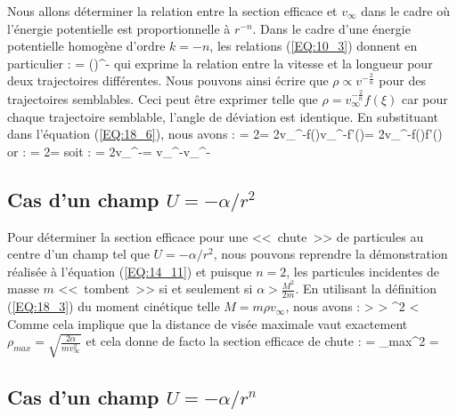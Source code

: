 Nous allons d\'eterminer la relation entre la section efficace et $v_{\infty}$ dans le cadre o\`u l'\'energie potentielle est proportionnelle \`a $r^{-n}$. Dans le cadre d'une \'energie potentielle homog\`ene d'ordre $k = -n$, les relations (\ref{EQ:10_3}) donnent en particulier :
\benn
	 = \left(\right)^{-}
\eenn
qui exprime la relation entre la vitesse et la longueur pour deux trajectoires diff\'erentes. Nous pouvons ainsi \'ecrire que $\rho\propto v^{-\frac{2}{n}}$ pour des trajectoires semblables. Ceci peut \^etre exprimer telle que $\rho = v_{\infty}^{-\frac{2}{n}}f(\xi)$ car pour chaque trajectoire semblable, l'angle de d\'eviation est identique. En substituant dans l'\'equation (\ref{EQ:18_6}), nous avons :
\benn
	\sigma = 2\pi\rho{}\rho = 2\pi v_{\infty}^{-}f(\xi)\cdot v_{\infty}^{-}f'(\xi)\xi = 2\pi v_{\infty}^{-}f(\xi)f'(\xi)\xi
\eenn
or :
\benn
	\omega = 2\pi\sin\xi{}\xi \Rightarrow {}\xi = 
\eenn
soit :
\benn
	\sigma = 2\pi v_{\infty}^{-}\omega = v_{\infty}^{-}\omega \propto v_{\infty}^{-}\omega
\eenn

\subsection{Cas d'un champ $U = -\alpha / r^{2}$}

Pour d\'eterminer la section efficace pour une <<~chute~>> de particules au centre d'un champ tel que $U = -\alpha / r^{2}$, nous pouvons reprendre la d\'emonstration r\'ealis\'ee à l'\'equation (\ref{EQ:14_11}) et puisque $n = 2$, les particules incidentes de masse $m$ <<~tombent~>> si et seulement si $\alpha > \frac{M^{2}}{2m}$. En utilisant la d\'efinition (\ref{EQ:18_3}) du moment cin\'etique telle $M = m\rho v_{\infty}$, nous avons :
\benn
	\alpha >  \Leftrightarrow \alpha >  \Leftrightarrow \rho^{2} < 
\eenn
Comme cela implique que la distance de vis\'ee maximale vaut exactement $\rho_{max} = \sqrt{\frac{2\alpha}{mv_{\infty}^{2}}}$ et cela donne de facto la section efficace de chute :
\benn
	\sigma = \pi\rho_{max}^{2} = 
\eenn

\subsection{Cas d'un champ $U = -\alpha / r^{n}$}

